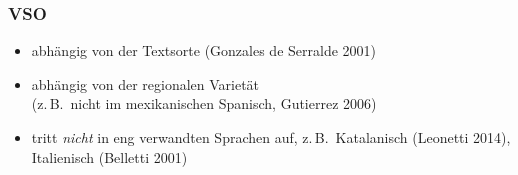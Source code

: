 \begin{frame}
  \frametitle{VSO}\begin{itemize}
\item abhängig von der Textsorte (Gonzales de Serralde 2001)
\item abhängig von der regionalen Varietät\\ (z.\,B.\ nicht im mexikanischen
  Spanisch, Gutierrez 2006)
\item tritt \textit{nicht} in eng verwandten Sprachen auf, z.\,B.\ Katalanisch (Leonetti 2014), Italienisch (Belletti 2001)%
\end{itemize}
  
\end{frame}



